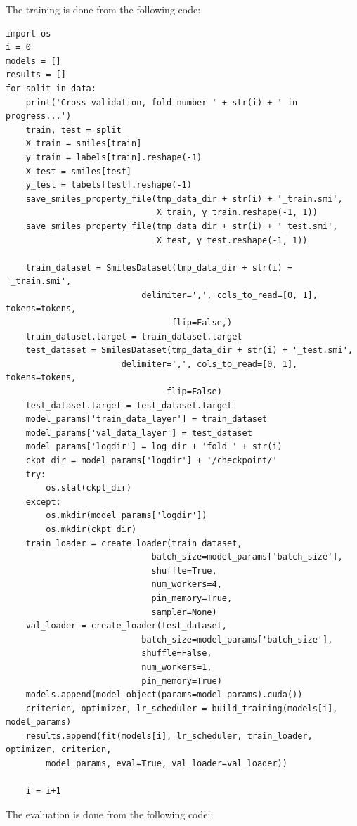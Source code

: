 \documentclass[a4paper]{article}
\begin{document}
The training is done from the following code:

\begin{lstlisting}
import os
i = 0
models = []
results = []
for split in data:
    print('Cross validation, fold number ' + str(i) + ' in progress...')
    train, test = split
    X_train = smiles[train]
    y_train = labels[train].reshape(-1)
    X_test = smiles[test]
    y_test = labels[test].reshape(-1)
    save_smiles_property_file(tmp_data_dir + str(i) + '_train.smi', 
                              X_train, y_train.reshape(-1, 1))
    save_smiles_property_file(tmp_data_dir + str(i) + '_test.smi', 
                              X_test, y_test.reshape(-1, 1))

    train_dataset = SmilesDataset(tmp_data_dir + str(i) + '_train.smi',
                           delimiter=',', cols_to_read=[0, 1], tokens=tokens,
                                 flip=False,)
    train_dataset.target = train_dataset.target
    test_dataset = SmilesDataset(tmp_data_dir + str(i) + '_test.smi',
                       delimiter=',', cols_to_read=[0, 1], tokens=tokens,
                                flip=False)
    test_dataset.target = test_dataset.target
    model_params['train_data_layer'] = train_dataset
    model_params['val_data_layer'] = test_dataset
    model_params['logdir'] = log_dir + 'fold_' + str(i)  
    ckpt_dir = model_params['logdir'] + '/checkpoint/'
    try:
        os.stat(ckpt_dir)
    except:
        os.mkdir(model_params['logdir'])
        os.mkdir(ckpt_dir)
    train_loader = create_loader(train_dataset,
                             batch_size=model_params['batch_size'],
                             shuffle=True,
                             num_workers=4,
                             pin_memory=True,
                             sampler=None)
    val_loader = create_loader(test_dataset,
                           batch_size=model_params['batch_size'],
                           shuffle=False,
                           num_workers=1,
                           pin_memory=True)
    models.append(model_object(params=model_params).cuda())
    criterion, optimizer, lr_scheduler = build_training(models[i], model_params)
    results.append(fit(models[i], lr_scheduler, train_loader, optimizer, criterion,
        model_params, eval=True, val_loader=val_loader))
    
    i = i+1
\end{lstlisting}

The evaluation is done from the following code:
\end{document}
